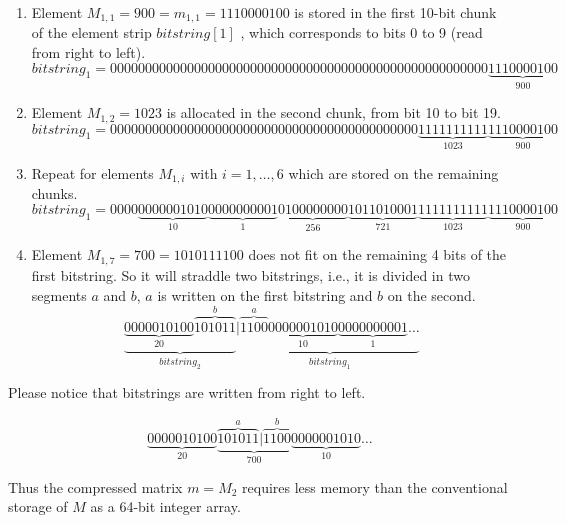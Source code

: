 \documentclass[10pt]{article}
\begin{document}
\begin{enumerate}
 \item Element $M_{1,1}=900 = m_{1,1} = 1110000100$ is stored in the first 10-bit chunk of the element strip $bitstring[1]$ , which corresponds to bits 0 to 9 (read from right to left).
\begin{equation*}\label{eq:04}
bitstring_1 = 000000000000000000000000000000000000000000000000000000\underbrace{1110000100}_{900} 
\end{equation*}
 \item Element $M_{1,2}=1023$ is allocated in the second chunk, from bit 10 to bit 19.
\begin{equation*}\label{eq:05}
 bitstring_1 = 00000000000000000000000000000000000000000000\underbrace{1111111111}_{1023}\underbrace{1110000100}_{900} 
\end{equation*}
 \item Repeat for elements $M_{1,i}$ with $i=1,\ldots,6$ which are stored on the remaining chunks.
 \begin{equation*}\label{eq:06}
bitstring_1 = 0000\underbrace{0000001010}_{10}\underbrace{0000000001}_{1}\underbrace{0100000000}_{256}\underbrace{1011010001}_{721}\underbrace{1111111111}_{1023}\underbrace{1110000100}_{900} 
 \end{equation*}
 \item Element $M_{1,7}=700=1010111100$ does not fit on the remaining 4 bits of the first bitstring. So it will straddle two bitstrings, i.e., it is divided in two segments $a$ and $b$, $a$ is written on the first bitstring and $b$ on the second.
 \begin{equation*}\label{eq:07}
  \underbrace{\underbrace{0000010100}_{20}\overbrace{101011}^{b}}_{bitstring_2}|\underbrace{\overbrace{1100}^{a}\underbrace{0000001010}_{10}\underbrace{0000000001}_{1}\hdots}_{bitstring_1}
\end{equation*}
\end{enumerate}

 Please notice that bitstrings are written from right to left.

\begin{equation*}\label{eq:8}
  \underbrace{0000010100}_{20}\underbrace{\overbrace{101011}^a|\overbrace{1100}^{b}}_{700}\underbrace{0000001010}_{10}\ldots
\end{equation*}

Thus the compressed matrix $m = M_2$ requires less memory than the conventional storage of $M$ as a 64-bit integer array.
\end{document}
